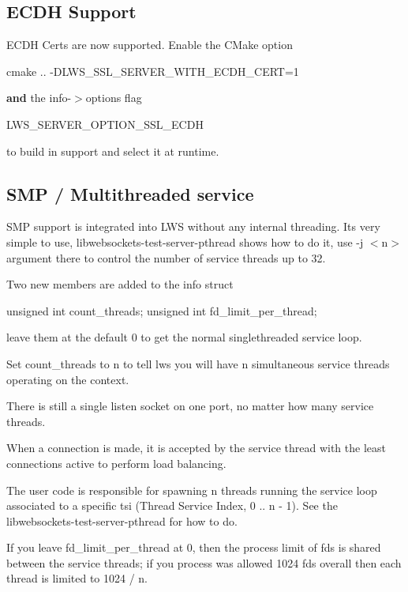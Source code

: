 \subsection*{E\+C\+DH Support }

E\+C\+DH Certs are now supported. Enable the C\+Make option \begin{DoxyVerb}    cmake .. -DLWS_SSL_SERVER_WITH_ECDH_CERT=1 
\end{DoxyVerb}


{\bfseries and} the info-\/$>$options flag \begin{DoxyVerb}    LWS_SERVER_OPTION_SSL_ECDH
\end{DoxyVerb}


to build in support and select it at runtime.

\subsection*{S\+MP / Multithreaded service }

S\+MP support is integrated into L\+WS without any internal threading. It\textquotesingle{}s very simple to use, libwebsockets-\/test-\/server-\/pthread shows how to do it, use -\/j $<$n$>$ argument there to control the number of service threads up to 32.

Two new members are added to the info struct \begin{DoxyVerb}    unsigned int count_threads;
    unsigned int fd_limit_per_thread;
\end{DoxyVerb}


leave them at the default 0 to get the normal singlethreaded service loop.

Set count\+\_\+threads to n to tell lws you will have n simultaneous service threads operating on the context.

There is still a single listen socket on one port, no matter how many service threads.

When a connection is made, it is accepted by the service thread with the least connections active to perform load balancing.

The user code is responsible for spawning n threads running the service loop associated to a specific tsi (Thread Service Index, 0 .. n -\/ 1). See the libwebsockets-\/test-\/server-\/pthread for how to do.

If you leave fd\+\_\+limit\+\_\+per\+\_\+thread at 0, then the process limit of fds is shared between the service threads; if you process was allowed 1024 fds overall then each thread is limited to 1024 / n.

